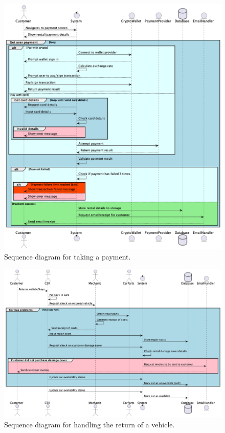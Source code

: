   \begin{figure}[H]
    \centering
    \includegraphics[width=12cm]{assets/Sequence2.png}
    \caption{Sequence diagram for taking a payment.}
    \label{fig:takePaymentSequence}
  \end{figure}

  \begin{figure}[H]
    \centering
    \includegraphics[width=12cm]{assets/Sequence3.png}
    \caption{Sequence diagram for handling the return of a vehicle.}
    \label{fig:vehicleReturnSequence}
  \end{figure}

